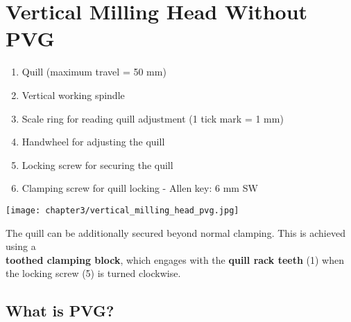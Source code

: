 
\section{Vertical Milling Head Without PVG}

\begin{minipage}{0.5\textwidth}
    \begin{enumerate}[itemsep=1pt,parsep=0pt]
        \item Quill (maximum travel = 50 mm)
        \item Vertical working spindle
        \item Scale ring for reading quill adjustment (1 tick mark = 1 mm)
        \item Handwheel for adjusting the quill
        \item Locking screw for securing the quill
        \item Clamping screw for quill locking - Allen key: 6 mm SW
    \end{enumerate}
\end{minipage}%
\begin{minipage}{0.5\textwidth}
    \centering
    \texttt{[image: chapter3/vertical\_milling\_head\_pvg.jpg]}
\end{minipage}

\vspace{0.5cm}

The quill can be additionally secured beyond normal clamping.  
This is achieved using a\\ \textbf{toothed clamping block}, which engages with the \textbf{quill rack teeth} (1) when the locking screw (5) is turned clockwise.

\vspace{0.3cm}


\vspace{0.3cm}


\vspace{0.5cm}

\subsection{What is PVG?}

